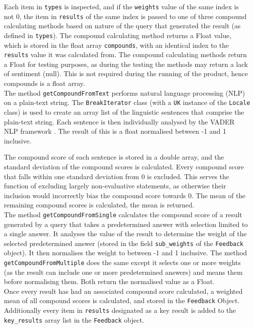 \documentclass[9pt, titlepage]{extarticle}
\begin{document}
Each item in \texttt{types} is inspected, and if the \texttt{weights} value of the same index is not 0, the item in \texttt{results} of the same index is passed to one of three compound calculating methods based on nature of the query that generated the result (as defined in \texttt{types}). The compound calculating method returns a Float value, which is stored in the float array \texttt{compounds}, with an identical index to the \texttt{results} value it was calculated from. The compound calculating methods return a Float for testing purposes, as during the testing the methods may return a lack of sentiment (null). This is not required during the running of the product, hence compounds is a float array.\\

The method \texttt{getCompoundFromText} performs natural language processing (NLP) on a plain-text string. The \texttt{BreakIterator} class (with a \texttt{UK} instance of the \texttt{Locale} class) is used to create an array list of the linguistic sentences that comprise the plain-text string. Each sentence is then individually analysed by the VADER NLP framework \cite{vader2}. The result of this is a float normalised between -1 and 1 inclusive. 

The compound score of each sentence is stored in a double array, and the standard deviation of the compound scores is calculated. Every compound score that falls within one standard deviation from 0 is excluded. This serves the function of excluding largely non-evaluative statements, as otherwise their inclusion would incorrectly bias the compound score towards 0. The mean of the remaining compound scores is calculated, the mean is returned.\\

The method \texttt{getCompoundFromSingle} calculates the compound score of a result generated by a query that takes a predetermined answer with selection limited to a single answer. It analyses the value of the result to determine the weight of the selected predetermined answer (stored in the field \texttt{sub\_weights} of the \texttt{Feedback} object). It then normalises the weight to between -1 and 1 inclusive. The method \texttt{getCompoundFromMultiple} does the same except it selects one or more weights (as the result can include one or more predetermined answers) and means them before normalising them. Both return the normalised value as a Float.\\

Once every result has had an associated compound score calculated, a weighted mean of all compound scores is calculated, and stored in the \texttt{Feedback} Object. Additionally every item in \texttt{results} designated as a key result is added to the \texttt{key\_results} array list in the \texttt{Feedback} object.
\end{document}
